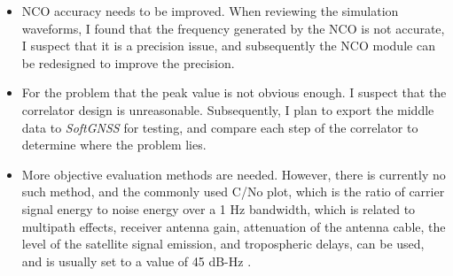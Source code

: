 \begin{itemize}
    \item NCO accuracy needs to be improved. When reviewing the simulation waveforms, I found that the frequency generated by the NCO is not accurate, I suspect that it is a precision issue, and subsequently the NCO module can be redesigned to improve the precision.
    \item For the problem that the peak value is not obvious enough. I suspect that the correlator design is unreasonable. Subsequently, I plan to export the middle data to \textit{SoftGNSS} for testing, and compare each step of the correlator to determine where the problem lies.
    \item More objective evaluation methods are needed. However, there is currently no such method, and the commonly used C/No plot, which is the ratio of carrier signal energy to noise energy over a 1 Hz bandwidth, which is related to multipath effects, receiver antenna gain, attenuation of the antenna cable, the level of the satellite signal emission, and tropospheric delays, can be used, and is usually set to a value of 45 dB-Hz \cite{RN211}.
\end{itemize}

